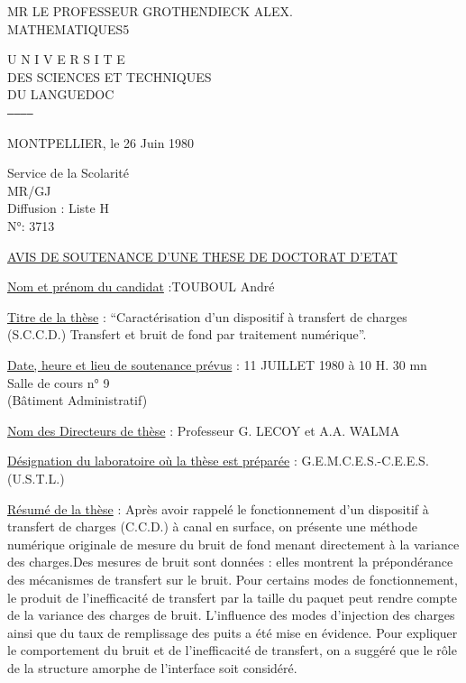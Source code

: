 MR LE PROFESSEUR GROTHENDIECK ALEX.\\
MATHEMATIQUES\hfill 5


\begin{center}
U N I V E R S I T E\\
DES SCIENCES ET TECHNIQUES\\
DU LANGUEDOC\\
\texttt{------------}
\end{center}

MONTPELLIER, le 26 Juin 1980

Service de la Scolarité\\
MR/GJ\\
Diffusion : Liste H\\
N°: 3713

\uline{AVIS DE SOUTENANCE D'UNE THESE DE DOCTORAT D'ETAT}

\uline{Nom et prénom du candidat} :TOUBOUL André

\uline{Titre de la thèse} : ``Caractérisation d'un dispositif à transfert de charges (S.C.C.D.) Transfert et bruit de fond par traitement numérique''.

\uline{Date, heure et lieu de soutenance prévus} : 11 JUILLET 1980 à 10 H. 30 mn\\
Salle de cours n° 9\\
(Bâtiment Administratif)

\uline{Nom des Directeurs de thèse} : Professeur G. LECOY et A.A. WALMA

\uline{Désignation du laboratoire où la thèse est préparée} : G.E.M.C.E.S.-C.E.E.S. (U.S.T.L.)

\uline{Résumé de la thèse} : Après avoir rappelé le fonctionnement d'un dispositif à transfert de charges (C.C.D.) à canal en surface, on présente une méthode numérique originale de mesure du bruit de fond menant directement à la variance des charges.Des mesures de bruit sont données : elles montrent la prépondérance des mécanismes de transfert sur le bruit. Pour certains modes de fonctionnement, le produit de l'inefficacité de transfert par la taille du paquet peut rendre compte de la variance des charges de bruit. L'influence des modes d'injection des charges ainsi que du taux de remplissage des puits a été mise en évidence. Pour expliquer le comportement du bruit et de l'inefficacité de transfert, on a suggéré que le rôle de la structure amorphe de l'interface soit considéré.


